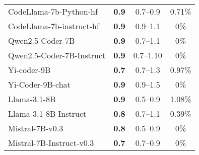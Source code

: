 \begin{table}[ht]
\begin{tabularx}{0.48\textwidth}{@{} l c c c @{}}
CodeLlama-7b-Python-hf & \textbf{0.9} & 0.7--0.9 & 0.71\%\\
CodeLlama-7b-instruct-hf & \textbf{0.9} & 0.9--1.1 &0\%\\
Qwen2.5-Coder-7B & \textbf{0.9} & 0.7--1.1 &0\%\\
Qwen2.5-Coder-7B-Instruct & \textbf{0.9} & 0.7--1.10 & 0\%\\
Yi-coder-9B & \textbf{0.7} & 0.7--1.3 & 0.97\%\\
Yi-Coder-9B-chat & \textbf{0.9} & 0.9--1.5 & 0\%\\
Llama-3.1-8B & \textbf{0.9} & 0.5--0.9 & 1.08\%\\
Llama-3.1-8B-Instruct & \textbf{0.8} & 0.7--1.1 & 0.39\%\\
Mistral-7B-v0.3 & \textbf{0.8} & 0.5--0.9 & 0\%\\
Mistral-7B-Instruct-v0.3 & \textbf{0.7} & 0.7--0.9 & 0\%\\
\bottomrule
\end{tabularx}
\end{table}